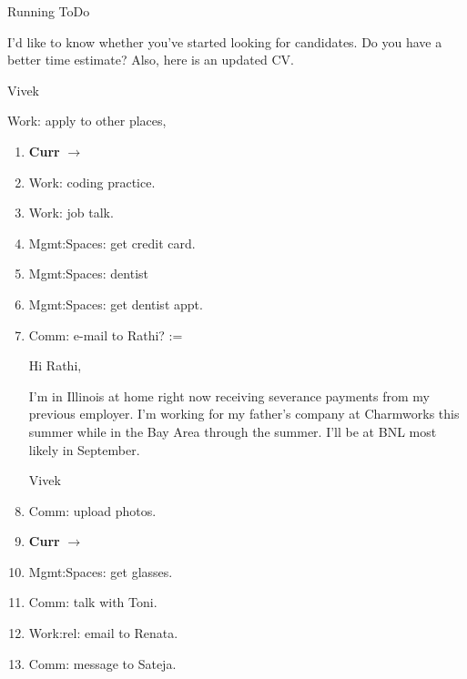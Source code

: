 \begin{columns}
\begin{column}{0.6\linewidth}
\begin{block}{Running ToDo}
{        I'd like to know whether you've started looking for candidates. Do you
        have a better time estimate? Also, here is an updated CV. 
       
        Vivek
}

      \item \tiny Work: apply to other places, 

      \begin{enumerate}

      \item \tiny \textbf{Curr} $\rightarrow$ 


      \item \tiny Work: coding practice. 

      \item \tiny Work: job talk. 

      \item \tiny Mgmt:Spaces: get credit card. 

      \item \tiny Mgmt:Spaces: dentist 

      \item \tiny Mgmt:Spaces: get dentist appt. 


      \item \tiny Comm: e-mail to Rathi?  := 


Hi Rathi, 

I'm in Illinois at home right now receiving severance payments from my
previous employer. I'm working for my father's company at Charmworks
this summer while in the Bay Area through the summer. I'll be at BNL most likely in September.

Vivek

      
      \item \tiny Comm: upload photos.
        
      \item \tiny \textbf{Curr} $\rightarrow$ 

      \item \tiny Mgmt:Spaces: get glasses. 
  
      \item \tiny Comm: talk with Toni. 
      \item \tiny Work:rel: email to Renata.  
      \item \tiny Comm: message to Sateja.
        

\end{enumerate}
\end{block}
\end{column}
\end{columns}
